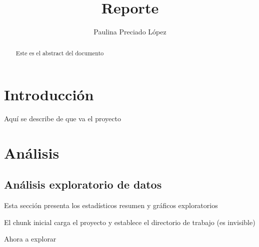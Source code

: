 \documentclass[12pt]{article}\usepackage[]{graphicx}\usepackage[]{color}
\title{Reporte}
\author{Paulina Preciado López}
\begin{document}
\maketitle
\thispagestyle{fancy}


\begin{abstract}
Este es el abstract del documento
\end{abstract}


\section{Introducción}
\label{sec:intro}

Aquí se describe de que va el proyecto

\section{Análisis}
\subsection{Análisis exploratorio de datos}

Esta sección presenta los estadísticos resumen y gráficos exploratorios

El chunk inicial carga el proyecto y establece el directorio de trabajo (es invisible)



Ahora a explorar
\end{document}
